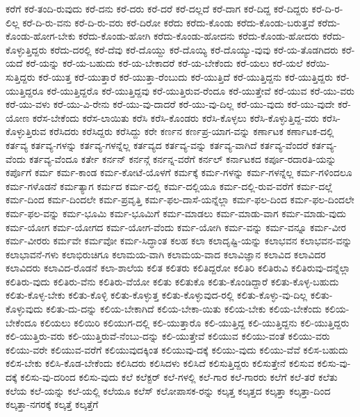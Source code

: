 {ಕರೆಗೆ
ಕರೆ-ತಂದಿ-ರುವುದು
ಕರೆ-ದನು
ಕರೆ-ದರು
ಕರೆ-ದರೆ
ಕರೆ-ದಲ್ಲದೆ
ಕರೆ-ದಾಗ
ಕರೆ-ದಿದ್ದ
ಕರೆ-ದಿದ್ದರು
ಕರೆ-ದಿ-ರ-ಲಿಲ್ಲ
ಕರೆ-ದಿ-ರು-ವನು
ಕರೆ-ದಿ-ರು-ವರು
ಕರೆ-ದಿರೋ
ಕರೆದು
ಕರೆದು-ಕೊಂಡು
ಕರೆದು-ಕೊಂಡು-ಬರುತ್ತವೆ
ಕರೆದು-ಕೊಂಡು-ಹೋಗ-ಬೇಕು
ಕರೆದು-ಕೊಂಡು-ಹೋಗಿ
ಕರೆದು-ಕೊಂಡು-ಹೋದನು
ಕರೆದು-ಕೊಂಡು-ಹೋದರು
ಕರೆದು-ಕೊಳ್ಳುತ್ತಿದ್ದರು
ಕರೆದು-ದರಲ್ಲಿ
ಕರೆ-ದೆವು
ಕರೆ-ದೊಯ್ದು
ಕರೆ-ದೊಯ್ಯಿ
ಕರೆ-ದೊಯ್ಯು-ವುವು
ಕರೆ-ಯ-ತೊಡಗಿದರು
ಕರೆ-ಯದೆ
ಕರೆ-ಯನ್ನು
ಕರೆ-ಯ-ಬಹುದು
ಕರೆ-ಯ-ಬೇಕಾದರೆ
ಕರೆ-ಯ-ಬೇಕೆಂದು
ಕರೆ-ಯಲು
ಕರೆ-ಯಲೆ
ಕರೆಯಿ-ಸುತ್ತಿದ್ದರು
ಕರೆ-ಯುತ್ತ
ಕರೆ-ಯುತ್ತಾರೆ
ಕರೆ-ಯುತ್ತಾ-ರೆಂಬುದು
ಕರೆ-ಯುತ್ತಿದೆ
ಕರೆ-ಯುತ್ತಿದ್ದನು
ಕರೆ-ಯುತ್ತಿದ್ದರು
ಕರೆ-ಯುತ್ತಿದ್ದರೂ
ಕರೆ-ಯುತ್ತಿದ್ದರೊ
ಕರೆ-ಯುತ್ತಿದ್ದವು
ಕರೆ-ಯುತ್ತಿರುವ-ರೆಂದೂ
ಕರೆ-ಯುತ್ತೇವೆ
ಕರೆ-ಯುವ
ಕರೆ-ಯು-ವರು
ಕರೆ-ಯು-ವಳು
ಕರೆ-ಯು-ವಿ-ರೇನು
ಕರೆ-ಯು-ವು-ದಾದರೆ
ಕರೆ-ಯು-ವು-ದಿಲ್ಲ
ಕರೆ-ಯು-ವುದು
ಕರೆ-ಯು-ವುದೇ
ಕರೆ-ಯೋಣ
ಕರೆಸ-ಬೇಕೆಂದು
ಕರೆಸ-ಲಾಯಿತು
ಕರೆಸಿ
ಕರೆಸಿ-ಕೊಂಡರು
ಕರೆಸಿ-ಕೊಳ್ಳಲು
ಕರೆಸಿ-ಕೊಳ್ಳುತ್ತಿದ್ದ-ವರು
ಕರೆಸಿ-ಕೊಳ್ಳುತ್ತಿರುವ
ಕರೆಸಿದರು
ಕರೆಸಿದ್ದರು
ಕರೆಸಿದ್ದು
ಕರೇ
ಕರ್ಣನ
ಕರ್ಣಪ್ರ-ಯಾಗ-ವನ್ನು
ಕರ್ಣಾಟಕ
ಕರ್ಣಾಟಕ-ದಲ್ಲಿ
ಕರ್ತವ್ಯ
ಕರ್ತವ್ಯ-ಗಳನ್ನು
ಕರ್ತವ್ಯ-ಗಳನ್ನೆಲ್ಲ
ಕರ್ತವ್ಯದ
ಕರ್ತವ್ಯ-ವನ್ನು
ಕರ್ತವ್ಯ-ವಾಗಿದೆ
ಕರ್ತವ್ಯ-ವೆಂದರೆ
ಕರ್ತವ್ಯ-ವೆಂದು
ಕರ್ತವ್ಯ-ವೆಂದೂ
ಕರ್ತೇ
ಕರ್ನನ್
ಕರ್ನನ್ಗೆ
ಕರ್ನನ್ನ-ವರೆಗೆ
ಕರ್ನಲ್
ಕರ್ನಾಟಕದ
ಕರ್ಪೂ-ರದಾರತಿ-ಯನ್ನು
ಕರ್ಪೊಗೆ
ಕರ್ಮ
ಕರ್ಮ-ಕಾಂಡ
ಕರ್ಮ-ಕೋಟೆ-ಯೊಳಗೆ
ಕರ್ಮಕ್ಕೆ
ಕರ್ಮ-ಗಳನ್ನು
ಕರ್ಮ-ಗಳನ್ನೆಲ್ಲ
ಕರ್ಮ-ಗಳಿಂದಲೂ
ಕರ್ಮ-ಗಳೊಡನೆ
ಕರ್ಮತ್ಯಾಗ
ಕರ್ಮದ
ಕರ್ಮ-ದಲ್ಲಿ
ಕರ್ಮ-ದಲ್ಲಿಯೂ
ಕರ್ಮ-ದಲ್ಲಿ-ರುವ-ವರೆಗೆ
ಕರ್ಮ-ದಲ್ಲೆ
ಕರ್ಮ-ದಿಂದ
ಕರ್ಮ-ದಿಂದಲೇ
ಕರ್ಮ-ಪ್ರವೃತ್ತಿ
ಕರ್ಮ-ಫಲ-ದಾಸೆ-ಯನ್ನೆಲ್ಲಾ
ಕರ್ಮ-ಫಲ-ದಿಂದ
ಕರ್ಮ-ಫಲ-ದಿಂದಲೇ
ಕರ್ಮ-ಫಲ-ವನ್ನು
ಕರ್ಮ-ಭೂಮಿ
ಕರ್ಮ-ಭೂಮಿಗೆ
ಕರ್ಮ-ಮಾಡಲು
ಕರ್ಮ-ಮಾಡು-ವಾಗ
ಕರ್ಮ-ಮಾಡು-ವುದು
ಕರ್ಮ-ಯೋಗ
ಕರ್ಮ-ಯೋಗದ
ಕರ್ಮ-ಯೋಗ-ವೆಂದು
ಕರ್ಮ-ಯೋಗಿ
ಕರ್ಮ-ವನ್ನು
ಕರ್ಮ-ವನ್ನೂ
ಕರ್ಮ-ವೀರ
ಕರ್ಮ-ವೀರರು
ಕರ್ಮವೇ
ಕರ್ಮವೋ
ಕರ್ಮ-ಸಿದ್ಧಾಂತ
ಕಲಹ
ಕಲಾ
ಕಲಾದೃಷ್ಟಿ-ಯನ್ನು
ಕಲಾಭವನ
ಕಲಾಭವನ-ವನ್ನು
ಕಲಾಭಾವನೆ-ಗಳು
ಕಲಾಭಿರುಚಿಗೂ
ಕಲಾಮಯ-ವಾಗಿ
ಕಲಾಮಯ-ವಾದ
ಕಲಾವಿಜ್ಞಾನ
ಕಲಾವಿದ
ಕಲಾವಿದರ
ಕಲಾವಿದರು
ಕಲಾವಿದ-ರೊಡನೆ
ಕಲಾ-ಶಾಲೆಯ
ಕಲಿತ
ಕಲಿತರು
ಕಲಿತಿದ್ದರೋ
ಕಲಿತಿರಿ
ಕಲಿತಿರುವಿ
ಕಲಿತಿರುವು-ದನ್ನೆಲ್ಲಾ
ಕಲಿತಿರು-ವುದು
ಕಲಿತಿರು-ವೆನು
ಕಲಿತಿರು-ವೆಯೋ
ಕಲಿತು
ಕಲಿತುಕೊ
ಕಲಿತು-ಕೊಂಡಿದ್ದಾರೆ
ಕಲಿತು-ಕೊಳ್ಳ-ಬಹುದು
ಕಲಿತು-ಕೊಳ್ಳ-ಬೇಕು
ಕಲಿತು-ಕೊಳ್ಳಿ
ಕಲಿತು-ಕೊಳ್ಳುತ್ತ
ಕಲಿತು-ಕೊಳ್ಳುವುದ-ರಲ್ಲಿ
ಕಲಿತು-ಕೊಳ್ಳು-ವು-ದಿಲ್ಲ
ಕಲಿತು-ಕೊಳ್ಳುವುದು
ಕಲಿತು-ದು-ದನ್ನು
ಕಲಿಯ-ಬೇಕಾಗಿದೆ
ಕಲಿಯ-ಬೇಕಾ-ಯಿತು
ಕಲಿಯ-ಬೇಕು
ಕಲಿಯ-ಬೇಕೆಂದು
ಕಲಿಯ-ಬೇಕೆಂದೂ
ಕಲಿಯಲು
ಕಲಿಯಿರಿ
ಕಲಿಯುಗ-ದಲ್ಲಿ
ಕಲಿ-ಯುತ್ತಾರೊ
ಕಲಿ-ಯುತ್ತಿದ್ದ
ಕಲಿ-ಯುತ್ತಿದ್ದನು
ಕಲಿ-ಯುತ್ತಿದ್ದರು
ಕಲಿ-ಯುತ್ತಿರು-ವರು
ಕಲಿ-ಯುತ್ತಿರುವೆ-ನೆಂಬು-ದನ್ನು
ಕಲಿ-ಯುತ್ತೇವೆ
ಕಲಿಯುವ
ಕಲಿಯು-ವಂತೆ
ಕಲಿಯು-ವರು
ಕಲಿಯು-ವರೇ
ಕಲಿಯುವ-ವರೆಗೆ
ಕಲಿಯುವುದಕ್ಕಿಂತ
ಕಲಿಯುವು-ದಕ್ಕೆ
ಕಲಿಯು-ವುದು
ಕಲಿಯು-ವೆವೆ
ಕಲಿಸ-ಬಹುದು
ಕಲಿಸ-ಬೇಕು
ಕಲಿಸಿ-ಕೊಡ-ಬೇಕೆಂದು
ಕಲಿಸಿದರು
ಕಲಿಸಿದಳು
ಕಲಿಸಿದೆ
ಕಲಿಸುತ್ತಿದ್ದರು
ಕಲಿಸುತ್ತೇನೆ
ಕಲಿಸುವ
ಕಲಿಸು-ವು-ದಕ್ಕೆ
ಕಲಿಸು-ವು-ದರಿಂದ
ಕಲಿಸು-ವುದು
ಕಲೆ
ಕಲೆಕ್ಟರ್
ಕಲೆ-ಗಳಲ್ಲಿ
ಕಲೆ-ಗಾರ
ಕಲೆ-ಗಾರರು
ಕಲೆಗೆ
ಕಲೆ-ತರೆ
ಕಲೆತು
ಕಲೆಯ
ಕಲೆ-ಯನ್ನು
ಕಲೆ-ಯಲ್ಲಿ
ಕಲೆಯೂ
ಕಲೆಸ್
ಕಲೋಪಾಸಕ-ರನ್ನು
ಕಲ್ಕತ್ತ
ಕಲ್ಕತ್ತದ
ಕಲ್ಕತ್ತಾ
ಕಲ್ಕತ್ತಾ-ದಿಂದ
ಕಲ್ಕತ್ತಾ-ನಗರಕ್ಕೆ
ಕಲ್ಕತ್ತೆ
ಕಲ್ಕತ್ತೆಗೆ
}
